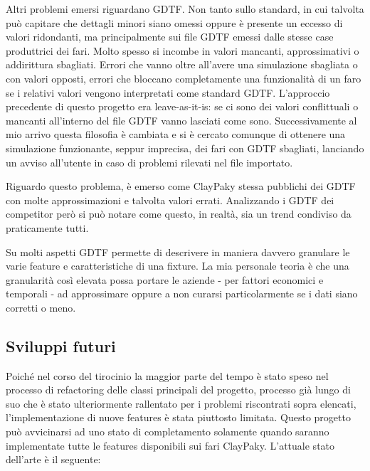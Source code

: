 \documentclass[main.tex]{subfiles}
\begin{document}
Altri problemi emersi riguardano GDTF. Non tanto sullo standard, in cui talvolta può capitare che dettagli minori siano omessi oppure è presente un eccesso di valori ridondanti, ma principalmente sui file GDTF emessi dalle stesse case produttrici dei fari. Molto spesso si incombe in valori mancanti, approssimativi o addirittura sbagliati. Errori che vanno oltre all'avere una simulazione sbagliata o con valori opposti, errori che bloccano completamente una funzionalità di un faro se i relativi valori vengono interpretati come standard GDTF. L'approccio precedente di questo progetto era leave-as-it-is: se ci sono dei valori conflittuali o mancanti all'interno del file GDTF vanno lasciati come sono. Successivamente al mio arrivo questa filosofia è cambiata e si è cercato comunque di ottenere una simulazione funzionante, seppur imprecisa, dei fari con GDTF sbagliati, lanciando un avviso all'utente in caso di problemi rilevati nel file importato.

Riguardo questo problema, è emerso come ClayPaky stessa pubblichi dei GDTF con molte approssimazioni e talvolta valori errati. Analizzando i GDTF dei competitor però si può notare come questo, in realtà, sia un trend condiviso da praticamente tutti. 

\noindent Su molti aspetti GDTF permette di descrivere in maniera davvero granulare le varie feature e caratteristiche di una fixture. La mia personale teoria è che una granularità così elevata possa portare le aziende - per fattori economici e temporali - ad approssimare oppure a non curarsi particolarmente se i dati siano corretti o meno. 

\clearpage
\subsection{Sviluppi futuri}\label{subsec:6_newDevelops}
Poiché nel corso del tirocinio la maggior parte del tempo è stato speso nel processo di refactoring delle classi principali del progetto, processo già lungo di suo che è stato ulteriormente rallentato per i problemi riscontrati sopra elencati, l'implementazione di nuove features è stata piuttosto limitata. Questo progetto può avvicinarsi ad uno stato di completamento solamente quando saranno implementate tutte le features disponibili sui fari ClayPaky. L'attuale stato dell'arte è il seguente: \newline
\end{document}
